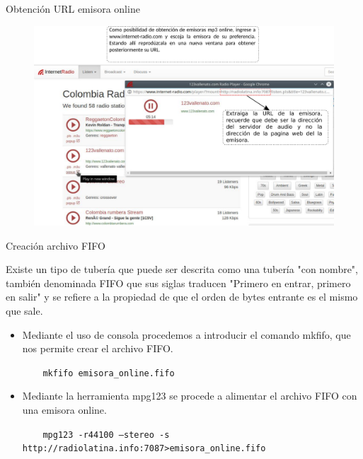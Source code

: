 \begin{frame}{Obtención URL emisora online}
    
\begin{figure}[H]
\centering
\vspace{-3mm}
\includegraphics[width=.9\textwidth]{parte3/lab13/pdf/lab13_2.pdf}
\end{figure}
    
\end{frame}

\begin{frame}{Creación archivo FIFO}

Existe un tipo de tubería que puede ser descrita como una tubería "con nombre", también denominada FIFO que sus siglas traducen "Primero en entrar, primero en salir" y se refiere a la propiedad de que el orden de bytes entrante es el mismo que sale.

\begin{itemize}
    \item {Mediante el uso de consola procedemos a introducir el comando mkfifo, que nos permite crear el archivo FIFO.
    
    \begin{block}{}
    \texttt{
    \ \ \ mkfifo emisora\_online.fifo}
    \end{block}
    }
    \item {Mediante la herramienta mpg123 se procede a alimentar el archivo FIFO con una emisora online.
    
    \begin{block}{}
    \texttt{
    \ \ \ mpg123 -r44100 --stereo -s http://radiolatina.info:7087>emisora\_online.fifo}
    \end{block}
    }
\end{itemize}
\end{frame}

